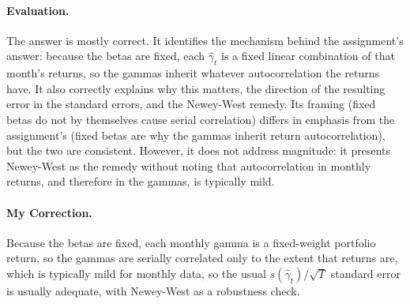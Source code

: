 \paragraph{Evaluation.} The answer is mostly correct. It identifies the
mechanism behind the assignment's answer: because the betas are fixed, each
$\hat\gamma_t$ is a fixed linear combination of that month's returns, so the
gammas inherit whatever autocorrelation the returns have. It also correctly
explains why this matters, the direction of the resulting error in the standard
errors, and the Newey-West remedy. Its framing (fixed betas do not by
themselves cause serial correlation) differs in emphasis from the assignment's
(fixed betas are why the gammas inherit return autocorrelation), but the two
are consistent. However, it does not address magnitude: it presents Newey-West
as the remedy without noting that autocorrelation in monthly returns, and
therefore in the gammas, is typically mild.

\paragraph{My Correction.} Because the betas are fixed, each monthly gamma is a
fixed-weight portfolio return, so the gammas are serially correlated only to
the extent that returns are, which is typically mild for monthly data, so the
usual $s(\hat\gamma_t)/\sqrt{T}$ standard error is usually adequate, with
Newey-West as a robustness check.
